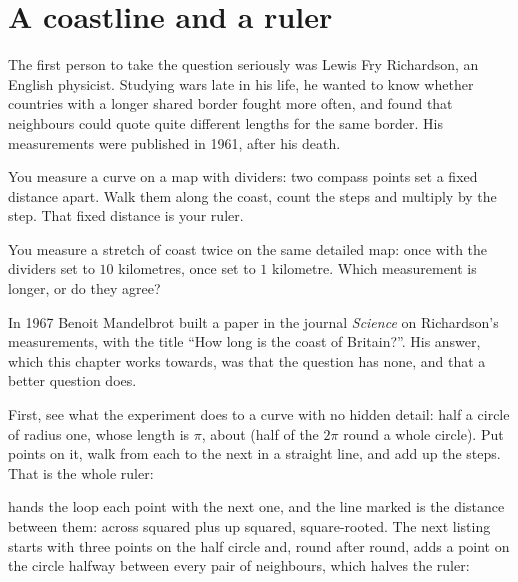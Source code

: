\section{A coastline and a ruler}
\label{sec:ch11-coast}

\noindent
The first person to take the question seriously was Lewis Fry Richardson,
an English physicist. Studying wars late in his life, he wanted to know
whether countries with a longer shared border fought more often, and found
that neighbours could quote quite different lengths for the same border.
His measurements were published in 1961, after his death.

You measure a curve on a map with dividers: two compass points set a fixed
distance apart. Walk them along the coast, count the steps and multiply by
the step. That fixed distance is your ruler.

\begin{think}
You measure a stretch of coast twice on the same detailed map: once with the
dividers set to $10$ kilometres, once set to $1$ kilometre. Which measurement
is longer, or do they agree?
\end{think}
In 1967 Benoit Mandelbrot built a paper in the journal \emph{Science} on
Richardson's measurements, with the title \enquote{How long is the coast of
Britain?}. His answer, which this chapter works towards, was that the
question has none, and that a better question does.

First, see what the experiment does to a curve with no hidden detail: half a
circle of radius one, whose length is $\pi$, about  (half of
the $2\pi$ round a whole circle). Put points on it, walk from each to the
next in a straight line, and add up the steps. That is the whole ruler:


\noindent
{} hands the loop each point with the next one, and the
line marked  is the distance between them: across squared
plus up squared, square-rooted. The next listing starts with three points on
the half circle and, round after round, adds a point on the circle halfway
between every pair of neighbours, which halves the ruler:


